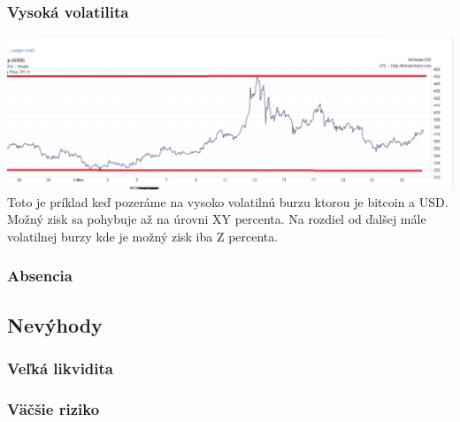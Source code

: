 \subsubsection{Vysoká volatilita}
\includegraphics[width=1\textwidth]{obr}
Toto je príklad keď pozeráme na vysoko volatilnú burzu ktorou je bitcoin a USD. Možný zisk sa pohybuje až na úrovni XY percenta. Na rozdiel od ďalšej mále volatilnej burzy kde je  možný zisk iba Z percenta.
\subsubsection{Absencia }
\subsection{Nevýhody}
\subsubsection{Veľká likvidita}
\subsubsection{Väčšie riziko}
